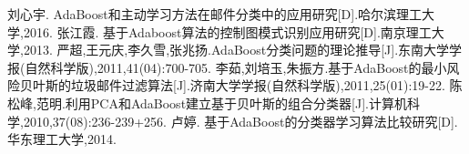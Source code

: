 \documentclass[a4paper,11pt,onecolumn,twoside]{article}
\begin{document}
\begin{multicols}{2}
\small
\begin{thebibliography}{99}
\setlength{\parskip}{0pt}  %
 刘心宇. AdaBoost和主动学习方法在邮件分类中的应用研究[D].哈尔滨理工大学,2016.
 张江霞. 基于Adaboost算法的控制图模式识别应用研究[D].南京理工大学,2013.
 严超,王元庆,李久雪,张兆扬.AdaBoost分类问题的理论推导[J].东南大学学报(自然科学版),2011,41(04):700-705.
 李茹,刘培玉,朱振方.基于AdaBoost的最小风险贝叶斯的垃圾邮件过滤算法[J].济南大学学报(自然科学版),2011,25(01):19-22.
 陈松峰,范明.利用PCA和AdaBoost建立基于贝叶斯的组合分类器[J].计算机科学,2010,37(08):236-239+256.
 卢婷. 基于AdaBoost的分类器学习算法比较研究[D].华东理工大学,2014.
\end{thebibliography}

\iffalse
\normalsize
\parpic{%
\includegraphics[width=3.0cm]%
{Hou.jpg}}
\indent 猴~~哥~~($xxx-$)，男，江苏花果山人，法号行者，是唐僧的大徒弟，会七十二变、腾云驾雾。
一双火眼金睛，能看穿妖魔鬼怪伪装的伎俩；一个筋斗能翻十万八千里；使用的兵器如意金箍棒，能大能小，
随心变化，小到绣花针，大到顶天立地。他占花果山为王，自称齐天大圣，搅乱王母娘娘的蟠桃胜会，
偷吃太上老君的长生不老金丹，打败天宫十万天兵天将，又自不量力地与如来佛祖斗法，被压在五行山下五百多年。
后来经观世音菩萨点化，保护唐僧西天取经，三打白骨精，收服红孩儿，熄灭火焰山，一路上降魔斗妖，
历经九九八十一难，取回真经终成正果。他嫉恶如仇，不怕困难，坚韧不拔，英勇无畏，取经后被封为斗战胜佛。\\
\indent 八~~戒~~($xxx-$)，男，天宫人，法号悟能，是唐僧的二徒弟，原来是玉皇大帝的天蓬元帅，
因调戏嫦娥被逐出天界，到人间投胎，却又错投猪胎，嘴脸与猪相似。他会变身术，能腾云驾雾，
使用的兵器是九齿钉钯。唐僧西去取经路过云栈洞，猪八戒被孙悟空收服，八戒从此成为孙悟空的好帮手，
一同保护唐僧西天取经。八戒性格温和，憨厚单纯，力气大，但又好吃懒做，爱占小便宜，贪图女色，
经常被妖怪的美色所迷，难分敌我。他对师兄的话言听计从，对师父忠心耿耿，为唐僧西天取经立下汗马功劳，
是个被人们喜爱同情的喜剧人物。
\fi
\end{multicols}

\clearpage
\end{document}
